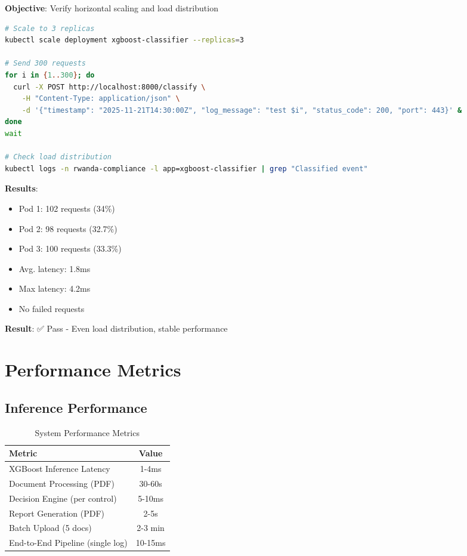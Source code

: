 \documentclass[11pt,conference]{IEEEtran}
\begin{document}
\textbf{Objective}: Verify horizontal scaling and load distribution

\begin{lstlisting}[language=bash]
# Scale to 3 replicas
kubectl scale deployment xgboost-classifier --replicas=3

# Send 300 requests
for i in {1..300}; do
  curl -X POST http://localhost:8000/classify \
    -H "Content-Type: application/json" \
    -d '{"timestamp": "2025-11-21T14:30:00Z", "log_message": "test $i", "status_code": 200, "port": 443}' &
done
wait

# Check load distribution
kubectl logs -n rwanda-compliance -l app=xgboost-classifier | grep "Classified event"
\end{lstlisting}

\textbf{Results}:
\begin{itemize}
    \item Pod 1: 102 requests (34\%)
    \item Pod 2: 98 requests (32.7\%)
    \item Pod 3: 100 requests (33.3\%)
    \item Avg. latency: 1.8ms
    \item Max latency: 4.2ms
    \item No failed requests
\end{itemize}

\textbf{Result}: ✅ Pass - Even load distribution, stable performance

\section{Performance Metrics}

\subsection{Inference Performance}

\begin{table}[h]
\centering
\caption{System Performance Metrics}
\begin{tabular}{|l|c|}
\hline
\textbf{Metric} & \textbf{Value} \\
\hline
XGBoost Inference Latency & 1-4ms \\
\hline
Document Processing (PDF) & 30-60s \\
\hline
Decision Engine (per control) & 5-10ms \\
\hline
Report Generation (PDF) & 2-5s \\
\hline
Batch Upload (5 docs) & 2-3 min \\
\hline
End-to-End Pipeline (single log) & 10-15ms \\
\hline
\end{tabular}
\end{table}
\end{document}
